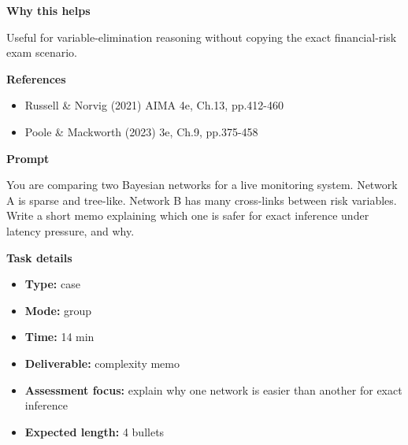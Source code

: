 \documentclass[11pt]{article}
\begin{document}
\begin{tcolorbox}[colback=white,colframe=MidnightBlue,title={Q3 Structured Problem},fonttitle=\bfseries,breakable]
{\large\bfseries\color{MidnightBlue} Why this helps}\par\medskip
Useful for variable-elimination reasoning without copying the exact financial-risk exam scenario.

{\large\bfseries\color{MidnightBlue} References}\par\medskip
\begin{itemize}\item Russell \& Norvig (2021) AIMA 4e, Ch.13, pp.412-460
\item Poole \& Mackworth (2023) 3e, Ch.9, pp.375-458\end{itemize}
\end{tcolorbox}

\begin{tcolorbox}[colback=white,colframe=MidnightBlue,title={Q4 Collaborative Mini-Case},fonttitle=\bfseries,breakable]
\begin{center}
\end{center}

{\large\bfseries\color{MidnightBlue} Prompt}\par\medskip
You are comparing two Bayesian networks for a live monitoring system. Network A is sparse and tree-like. Network B has many cross-links between risk variables. Write a short memo explaining which one is safer for exact inference under latency pressure, and why.

{\large\bfseries\color{MidnightBlue} Task details}\par\medskip
\begin{itemize}\item \textbf{Type:} case
\item \textbf{Mode:} group
\item \textbf{Time:} 14 min
\item \textbf{Deliverable:} complexity memo
\item \textbf{Assessment focus:} explain why one network is easier than another for exact inference
\item \textbf{Expected length:} 4 bullets\end{itemize}


\end{tcolorbox}
\end{document}
